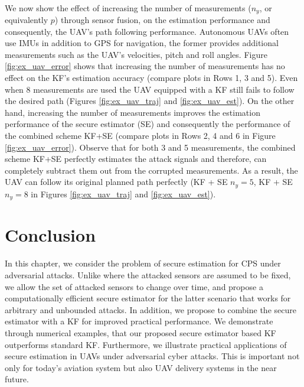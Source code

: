 \documentclass[../../thesis.tex]{subfiles}
\begin{document}
\\
We now show the effect of increasing the number of measurements ($n_y$, or equivalently $p$) through sensor fusion, on the estimation performance and consequently, the UAV's path following performance. Autonomous UAVs often use IMUs in addition to GPS for navigation, the former provides additional measurements such as the UAV's velocities, pitch and roll angles. Figure \ref{fig:ex_uav_error} shows that increasing the number of measurements has no effect on the KF's estimation accuracy (compare plots in Rows 1, 3 and 5). 
Even when 8 measurements are used the UAV equipped with a KF still fails to follow the desired path (Figures \ref{fig:ex_uav_traj} and \ref{fig:ex_uav_est}). On the other hand, increasing the number of measurements improves the estimation performance of the secure estimator (SE) and consequently the performance of the combined scheme KF+SE (compare plots in Rows 2, 4 and 6 in Figure  \ref{fig:ex_uav_error}). Observe that for both 3 and 5 measurements, the combined scheme KF+SE perfectly estimates the attack signals and therefore, can completely subtract them out from the corrupted measurements. As a result, the UAV can follow its original planned path perfectly (KF + SE $n_y=5$, KF + SE $n_y=8$ in Figures \ref{fig:ex_uav_traj} and \ref{fig:ex_uav_est}).



\section{Conclusion}
In this chapter, we consider the problem of secure estimation for CPS under adversarial attacks. Unlike \cite{Fawzi:2014} where the attacked sensors are assumed to be fixed, we allow the set of attacked sensors to change over time, and propose a computationally efficient secure estimator for the latter scenario that works for arbitrary and unbounded attacks. In addition, we propose to combine the secure estimator with a KF for improved practical performance. We demonstrate through numerical examples, that our proposed secure estimator based KF outperforms standard KF. Furthermore, we illustrate practical applications of secure estimation in UAVs under adversarial cyber attacks. This is important not only for today's aviation system but also UAV delivery systems in the near future. 
\end{document}
